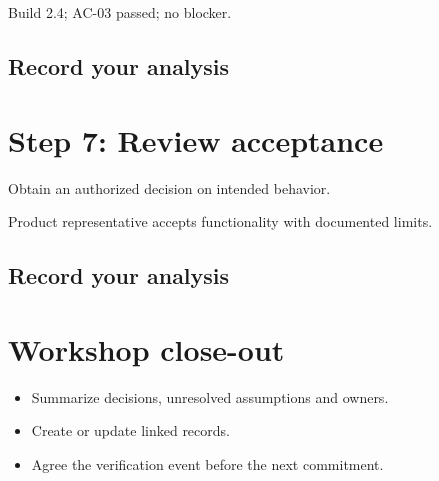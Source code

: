 \documentclass[11pt,letterpaper]{article}
\begin{document}
\begin{tcolorbox}[colback=tealback,colframe=navy,title={Illustration},breakable]
Build 2.4; AC-03 passed; no blocker.

\end{tcolorbox}
\subsection{Record your analysis}
\section{Step 7: Review acceptance}
Obtain an authorized decision on intended behavior.

\begin{tcolorbox}[colback=tealback,colframe=navy,title={Illustration},breakable]
Product representative accepts functionality with documented limits.

\end{tcolorbox}
\subsection{Record your analysis}
\section{Workshop close-out}
\begin{itemize}[leftmargin=*,itemsep=2pt]
\item Summarize decisions, unresolved assumptions and owners.
\item Create or update linked records.
\item Agree the verification event before the next commitment.
\end{itemize}
\end{document}
